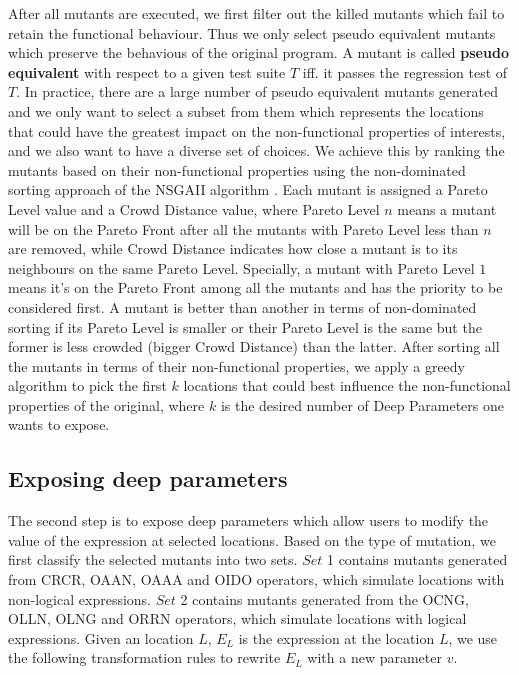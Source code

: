 After all mutants are executed, we first filter out the killed mutants which fail to retain the functional behaviour.  Thus we only select pseudo equivalent mutants which preserve the behavious of the original program. A mutant is called \textbf{pseudo equivalent} with respect to a given test suite $T$ iff. it passes the regression test of $T$.
In practice, there are a large number of pseudo equivalent mutants \cite{5477100} generated and we only want to select a subset from them which represents the locations that could have the greatest impact on the non-functional properties of interests, and we also want to have a diverse set of choices.  
We achieve this by ranking the mutants based on their non-functional properties using the non-dominated sorting approach of the NSGAII algorithm \cite{996017}. Each mutant is assigned a Pareto Level value and a Crowd Distance value, where Pareto Level $n$ means a mutant will be on the Pareto Front after all the mutants with Pareto Level less than $n$ are removed, while Crowd Distance indicates how close a mutant is to its neighbours on the same Pareto Level. Specially, a mutant with Pareto Level $1$ means it's on the Pareto Front among all the mutants and has the priority to be considered first. A mutant is better than another in terms of non-dominated sorting if its Pareto Level is smaller or their Pareto Level is the same but the former is less crowded (bigger Crowd Distance) than the latter. After sorting all the mutants in terms of their non-functional properties, we apply a greedy algorithm to pick the first $k$ locations that could best influence the non-functional properties of the original, where $k$ is the desired number of Deep Parameters one wants to expose.

\subsection{Exposing deep parameters}
\label{exposing}
The second step is to expose deep parameters which allow users to modify the value of the expression at selected locations. Based on the type of mutation, we first classify the selected mutants into two sets. $Set$ 1 contains mutants generated from CRCR, OAAN, OAAA and OIDO operators, which simulate locations with non-logical expressions. $Set$ 2 contains mutants generated from the OCNG, OLLN, OLNG and ORRN operators, which simulate locations with logical expressions. 
Given an location $L$, $E_L$ is the expression at the location $L$, we use the following transformation rules to rewrite $E_L$ with a new parameter $v$.

